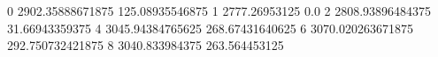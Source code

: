 0 2902.35888671875 125.08935546875
1 2777.26953125 0.0
2 2808.93896484375 31.66943359375
4 3045.94384765625 268.67431640625
6 3070.020263671875 292.750732421875
8 3040.833984375 263.564453125
